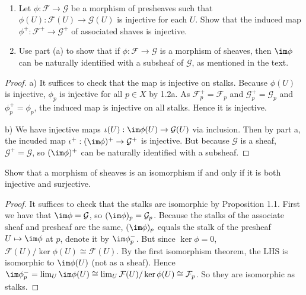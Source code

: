 \begin{exercise}%
	~
	\begin{enumerate}
		\item Let $\phi :\mathcal{F}\to \mathcal{G} $ be a morphism of presheaves such that $\phi (U): \mathcal{F}(U) \to \mathcal{G}(U) $ is injective for each $U $. Show that the induced map $\phi ^+: \mathcal{F}^+ \to \mathcal{G}^+ $ of associated shaves is injective.
		\item Use part (a) to show that if $\phi : \mathcal{F}\to \mathcal{G} $ is a morphism of sheaves, then $\im \phi  $ can be naturally identified with a subsheaf of $\mathcal{G} $, as mentioned in the text.
	\end{enumerate}
\end{exercise}
\begin{proof}
	a) It suffices to check that the map is injective on stalks.
	Because $\phi(U)$ is injective, $\phi_p $ is injective for all $p \in X $ by 1.2a.
	As $\mathcal{F}^+_p = \mathcal{F}_p $ and $\mathcal{G}^+_p = \mathcal{G}_p $ and $\phi^+_p = \phi_p $, the induced map is injective on all stalks.
	Hence it is injective.

	b) 
	We have injective maps $\iota (U): \im \phi (U) \to \mathcal{G}(U) $ via inclusion.
	Then by part a, the incuded map $\iota^+: (\im \phi)^+ \to \mathcal{G}^+$ is injective.
	But because $\mathcal{G} $ is a sheaf, $\mathcal{G}^+ = \mathcal{G} $, so $(\im \phi )^+ $ can be naturally identified with a subsheaf.
\end{proof}
%
\begin{exercise}%
	Show that a morphism of sheaves is an isomorphism if and only if it is both injective and surjective. 
\end{exercise}
\begin{proof}
	It suffices to check that the stalks are isomorphic by Proposition 1.1.
	First we have that $\im \phi = \mathcal{G} $, so $(\im \phi)_p = \mathcal{G}_p $.
	Because the stalks of the associate sheaf and presheaf are the same, $(\im \phi)_p $ equals the stalk of the presheaf $U\mapsto \im \phi $ at $p $, denote it by $\im \phi^-_p $.
	But since $\ker \phi = 0 $, $\mathcal{F}(U) / \ker \phi(U) \cong \mathcal{F}(U)$.
	By the first isomorphism theorem, the LHS is isomorphic to $\im \phi(U) $ (not as a sheaf).
	Hence $\im\phi^-_p = \lim_{U} \im\phi(U) \cong \lim_U \mathcal{F}(U) / \ker \phi(U) \cong \mathcal{F}_p$.
	So they are isomorphic as stalks.
\end{proof}

